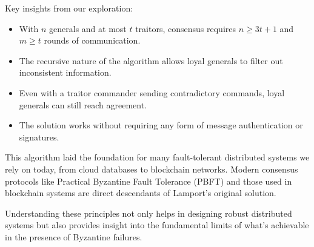 \documentclass[11pt]{article}
\begin{document}
Key insights from our exploration:

\begin{itemize}
    \item With $n$ generals and at most $t$ traitors, consensus requires $n \geq 3t+1$ and $m \geq t$ rounds of communication.
    \item The recursive nature of the algorithm allows loyal generals to filter out inconsistent information.
    \item Even with a traitor commander sending contradictory commands, loyal generals can still reach agreement.
    \item The solution works without requiring any form of message authentication or signatures.
\end{itemize}

This algorithm laid the foundation for many fault-tolerant distributed systems we rely on today, from cloud databases to blockchain networks. Modern consensus protocols like Practical Byzantine Fault Tolerance (PBFT) and those used in blockchain systems are direct descendants of Lamport's original solution.

Understanding these principles not only helps in designing robust distributed systems but also provides insight into the fundamental limits of what's achievable in the presence of Byzantine failures.
\end{document}

